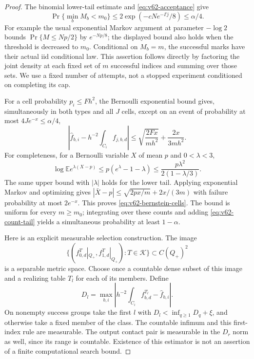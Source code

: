 \begin{proof}
The binomial lower-tail estimate and \eqref{eq:v62-acceptance} give
\begin{equation}\label{eq:v62-count-tail}
 \Pr\{\min_b M_b<m_0\}\le
                 2\exp(-cNe^{-\Gamma j}/8)\le\alpha/4.
\end{equation}
For example the usual exponential Markov argument at parameter
$-\log2$ bounds $\Pr\{M\le Np/2\}$ by $e^{-Np/8}$; the displayed
bound also holds when the threshold is decreased to $m_0$.
Conditional on $M_b=m$, the successful marks have their actual iid
conditional law.  This assertion follows directly by factoring the
joint density at each fixed set of $m$ successful indices and summing
over those sets.  We use a fixed number of attempts, not a stopped
experiment conditioned on completing its cap.

For a cell probability $p_i\le Fh^2$, the Bernoulli exponential bound
gives, simultaneously in both types and all $J$ cells, except on an
event of probability at most $4Je^{-x}\le\alpha/4$,
\begin{equation}\label{eq:v62-bernstein-cells}
 \left|\widehat f_{b,i}-h^{-2}\int_{C_i}f_{j,b,d}\right|
  \le \sqrt{\frac{2Fx}{mh^2}}+\frac{2x}{3mh^2}.
\end{equation}
For completeness, for a Bernoulli variable $X$ of mean $p$ and
$0<\lambda<3$,
\[
 \log\mathbb E e^{\lambda(X-p)}
 \le p(e^\lambda-1-\lambda)
 \le \frac{p\lambda^2}{2(1-\lambda/3)}.
\]
The same upper bound with $|\lambda|$ holds for the lower tail.
Applying exponential Markov and optimizing gives
$|\bar X-p|\le\sqrt{2px/m}+2x/(3m)$ with failure probability at most
$2e^{-x}$.  This proves \eqref{eq:v62-bernstein-cells}.
The bound is uniform for every $m\ge m_0$; integrating over these
counts and adding \eqref{eq:v62-count-tail} yields a simultaneous
probability at least $1-\alpha$.

Here is an explicit measurable selection construction.  The image
\[
 \{(f_{0,d}^T|_{Q_+},f_{1,d}^T|_{Q_+}):T\in\mathcal K\}
                    \subset C(Q_+)^2
\]
is a separable metric space.  Choose once a countable dense subset of
this image and a realizing table $T_l$ for each of its members.  Define
\[
 D_l=\max_{b,i}\left|
             h^{-2}\int_{C_i}f_{b,d}^{T_l}-\widehat f_{b,i}\right|.
\]
On nonempty success groups take the first $l$ with
$D_l<\inf_{q\ge1}D_q+\xi$, and otherwise take a fixed member of the
class.  The countable infimum and this first-index rule are measurable.
The output contact pair is measurable in the $D_r$ norm as well, since
its range is countable.  Existence of this estimator is not an assertion
of a finite computational search bound.


\end{proof}
